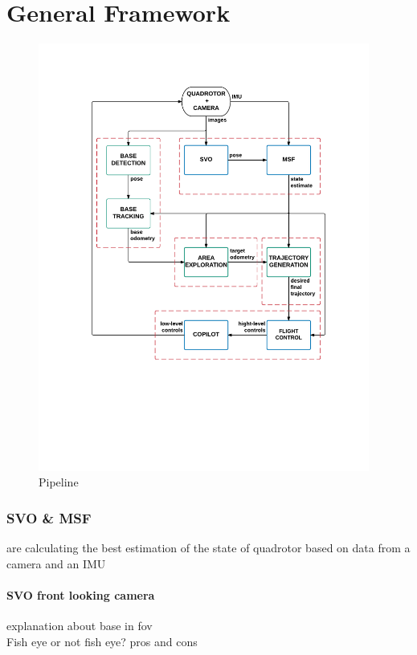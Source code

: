 \chapter{General Framework}\label{chap:general_framework}

\begin{figure}[!ht]
    \centering
    \includegraphics[width=0.97\textwidth]{img/pipeline_diagram.pdf}
    \caption{Pipeline}
    \label{fig:pipeline_diagram}
\end{figure}

\subsection{SVO \& MSF}
are calculating the best estimation of the state of quadrotor based on data from a camera and an IMU
\subsubsection{SVO front looking camera}
explanation about base in fov\\
Fish eye or not fish eye? pros and cons
